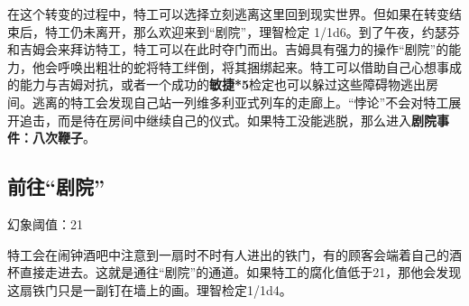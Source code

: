 在这个转变的过程中，特工可以选择立刻逃离这里回到现实世界。但如果在转变结束后，特工仍未离开，那么欢迎来到“剧院”，理智检定 1/1d6。到了午夜，约瑟芬和吉姆会来拜访特工，特工可以在此时夺门而出。吉姆具有强力的操作“剧院”的能力，他会呼唤出粗壮的蛇将特工绊倒，将其捆绑起来。特工可以借助自己心想事成的能力与吉姆对抗，或者一个成功的\textbf{敏捷*5}检定也可以躲过这些障碍物逃出房间。逃离的特工会发现自己站一列维多利亚式列车的走廊上。“悖论”不会对特工展开追击，而是待在房间中继续自己的仪式。如果特工没能逃脱，那么进入\textbf{剧院事件：八次鞭子}。

\subsection{前往“剧院”}
幻象阈值：21

特工会在闹钟酒吧中注意到一扇时不时有人进出的铁门，有的顾客会端着自己的酒杯直接走进去。这就是通往“剧院”的通道。如果特工的腐化值低于21，那他会发现这扇铁门只是一副钉在墙上的画。理智检定1/1d4。

